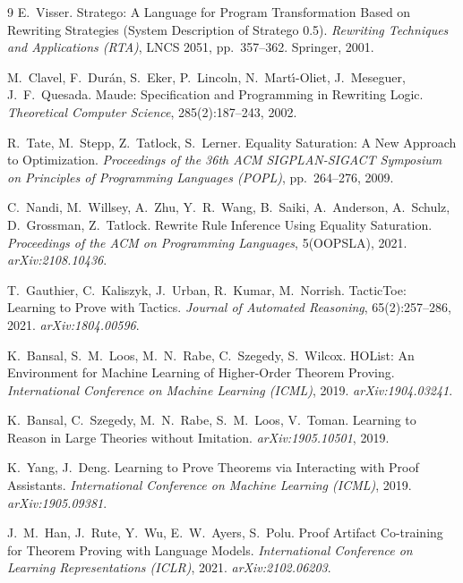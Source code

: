 \documentclass[11pt]{article}
\numberwithin{equation}{section}
\begin{document}
\begin{thebibliography}{9}
E.~Visser.
\newblock Stratego: A Language for Program Transformation Based on Rewriting Strategies (System Description of Stratego 0.5).
\newblock \emph{Rewriting Techniques and Applications (RTA)}, LNCS 2051, pp.~357--362. Springer, 2001.

M.~Clavel, F.~Dur\'{a}n, S.~Eker, P.~Lincoln, N.~Mart\'{\i}-Oliet, J.~Meseguer, J.~F.~Quesada.
\newblock Maude: Specification and Programming in Rewriting Logic.
\newblock \emph{Theoretical Computer Science}, 285(2):187--243, 2002.

R.~Tate, M.~Stepp, Z.~Tatlock, S.~Lerner.
\newblock Equality Saturation: A New Approach to Optimization.
\newblock \emph{Proceedings of the 36th ACM SIGPLAN-SIGACT Symposium on Principles of Programming Languages (POPL)}, pp.~264--276, 2009.

C.~Nandi, M.~Willsey, A.~Zhu, Y.~R.~Wang, B.~Saiki, A.~Anderson, A.~Schulz, D.~Grossman, Z.~Tatlock.
\newblock Rewrite Rule Inference Using Equality Saturation.
\newblock \emph{Proceedings of the ACM on Programming Languages}, 5(OOPSLA), 2021. \emph{arXiv:2108.10436}.

T.~Gauthier, C.~Kaliszyk, J.~Urban, R.~Kumar, M.~Norrish.
\newblock TacticToe: Learning to Prove with Tactics.
\newblock \emph{Journal of Automated Reasoning}, 65(2):257--286, 2021. \emph{arXiv:1804.00596}.

K.~Bansal, S.~M.~Loos, M.~N.~Rabe, C.~Szegedy, S.~Wilcox.
\newblock HOList: An Environment for Machine Learning of Higher-Order Theorem Proving.
\newblock \emph{International Conference on Machine Learning (ICML)}, 2019. \emph{arXiv:1904.03241}.

K.~Bansal, C.~Szegedy, M.~N.~Rabe, S.~M.~Loos, V.~Toman.
\newblock Learning to Reason in Large Theories without Imitation.
\newblock \emph{arXiv:1905.10501}, 2019.

K.~Yang, J.~Deng.
\newblock Learning to Prove Theorems via Interacting with Proof Assistants.
\newblock \emph{International Conference on Machine Learning (ICML)}, 2019. \emph{arXiv:1905.09381}.

J.~M.~Han, J.~Rute, Y.~Wu, E.~W.~Ayers, S.~Polu.
\newblock Proof Artifact Co-training for Theorem Proving with Language Models.
\newblock \emph{International Conference on Learning Representations (ICLR)}, 2021. \emph{arXiv:2102.06203}.


\end{thebibliography}
\end{document}
